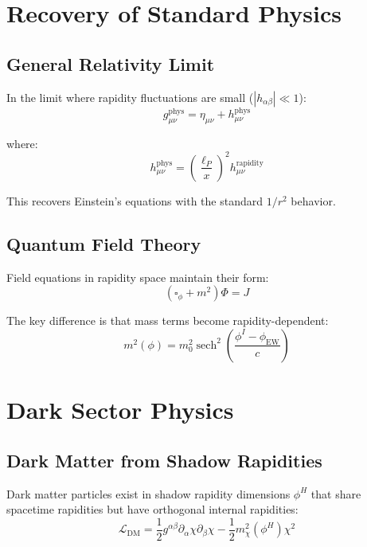 \documentclass[12pt,a4paper]{article}
\begin{document}
\section{Recovery of Standard Physics}

\subsection{General Relativity Limit}

In the limit where rapidity fluctuations are small ($|h_{\alpha\beta}| \ll 1$):
\begin{equation}
g_{\mu\nu}^{\text{phys}} = \eta_{\mu\nu} + h_{\mu\nu}^{\text{phys}}
\end{equation}

where:
\begin{equation}
h_{\mu\nu}^{\text{phys}} = \left(\frac{\ell_P}{x}\right)^2 h_{\mu\nu}^{\text{rapidity}}
\end{equation}

This recovers Einstein's equations with the standard $1/r^2$ behavior.

\subsection{Quantum Field Theory}

Field equations in rapidity space maintain their form:
\begin{equation}
(\square_\phi + m^2) \Phi = J
\end{equation}

The key difference is that mass terms become rapidity-dependent:
\begin{equation}
m^2(\phi) = m_0^2 \operatorname{sech}^2\left(\frac{\phi^I - \phi_{\text{EW}}}{c}\right)
\end{equation}

\section{Dark Sector Physics}

\subsection{Dark Matter from Shadow Rapidities}

Dark matter particles exist in shadow rapidity dimensions $\phi^H$ that share spacetime rapidities but have orthogonal internal rapidities:
\begin{equation}
\mathcal{L}_{\text{DM}} = \frac{1}{2} g^{\alpha\beta} \partial_\alpha \chi \partial_\beta \chi - \frac{1}{2} m_\chi^2(\phi^H) \chi^2
\end{equation}
\end{document}
